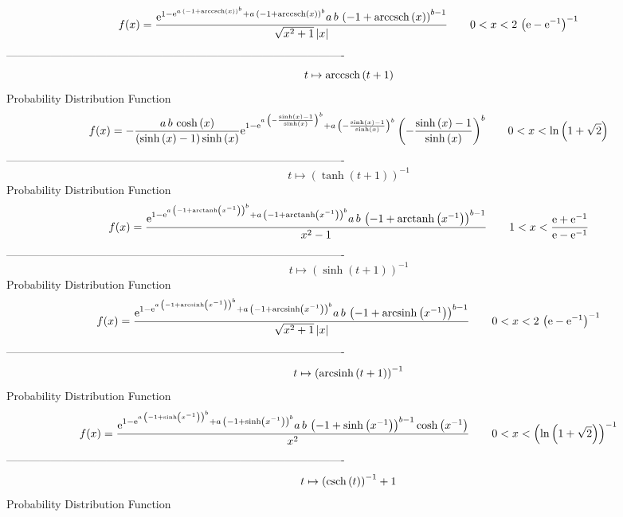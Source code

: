 \documentclass[12pt]{article}
\begin{document}
$$  f(x)={\frac {{{\rm e}^{1-{{\rm e}^{a\, \left( -1+{\rm arccsch} \left(x
\right) \right) ^{b}}}+a\, \left( -1+{\rm arccsch} \left(x\right)
 \right) ^{b}}}a\,b\, \left( -1+{\rm arccsch} \left(x\right) \right) ^
{b-1}}{\sqrt {{x}^{2}+1} \left| x \right| }}
 \qquad0
 < x < 2\, \left( {\rm e}-{{\rm e}^{-1}} \right) ^{-1}
$$-------------------------------------------------------------------------------------------  \\$$t\mapsto {\rm arccsch} \left(t+1\right)
$$Probability Distribution Function 
$$  f(x)=-{\frac {a\,b\,\cosh \left( x \right) }{ \left( \sinh \left( x
 \right) -1 \right) \sinh \left( x \right) }{{\rm e}^{1-{{\rm e}^{a\,
 \left( -{\frac {\sinh \left( x \right) -1}{\sinh \left( x \right) }}
 \right) ^{b}}}+a\, \left( -{\frac {\sinh \left( x \right) -1}{\sinh
 \left( x \right) }} \right) ^{b}}} \left( -{\frac {\sinh \left( x
 \right) -1}{\sinh \left( x \right) }} \right) ^{b}}
 \qquad0
 < x < \ln  \left( 1+\sqrt {2} \right) 
$$-------------------------------------------------------------------------------------------  \\$$t\mapsto  \left( \tanh \left( t+1 \right)  \right) ^{-1}
$$Probability Distribution Function 
$$  f(x)={\frac {{{\rm e}^{1-{{\rm e}^{a\, \left( -1+{\rm arctanh} \left({x}^{-
1}\right) \right) ^{b}}}+a\, \left( -1+{\rm arctanh} \left({x}^{-1}
\right) \right) ^{b}}}a\,b\, \left( -1+{\rm arctanh} \left({x}^{-1}
\right) \right) ^{b-1}}{{x}^{2}-1}}
 \qquad1
 < x < {\frac {{\rm e}+{{\rm e}^{-1}}}{{\rm e}-{{\rm e}^{-1}}}}
$$-------------------------------------------------------------------------------------------  \\$$t\mapsto  \left( \sinh \left( t+1 \right)  \right) ^{-1}
$$Probability Distribution Function 
$$  f(x)={\frac {{{\rm e}^{1-{{\rm e}^{a\, \left( -1+{\rm arcsinh} \left({x}^{-
1}\right) \right) ^{b}}}+a\, \left( -1+{\rm arcsinh} \left({x}^{-1}
\right) \right) ^{b}}}a\,b\, \left( -1+{\rm arcsinh} \left({x}^{-1}
\right) \right) ^{b-1}}{\sqrt {{x}^{2}+1} \left| x \right| }}
 \qquad0
 < x < 2\, \left( {\rm e}-{{\rm e}^{-1}} \right) ^{-1}
$$-------------------------------------------------------------------------------------------  \\$$t\mapsto  \left( {\rm arcsinh} \left(t+1\right) \right) ^{-1}
$$Probability Distribution Function 
$$  f(x)={\frac {{{\rm e}^{1-{{\rm e}^{a\, \left( -1+\sinh \left( {x}^{-1}
 \right)  \right) ^{b}}}+a\, \left( -1+\sinh \left( {x}^{-1} \right) 
 \right) ^{b}}}a\,b\, \left( -1+\sinh \left( {x}^{-1} \right) 
 \right) ^{b-1}\cosh \left( {x}^{-1} \right) }{{x}^{2}}}
 \qquad0
 < x <  \left( \ln  \left( 1+\sqrt {2} \right)  \right) ^{-1}
$$-------------------------------------------------------------------------------------------  \\$$t\mapsto  \left( {\rm csch} \left(t\right) \right) ^{-1}+1
$$Probability Distribution Function 
\end{document}
